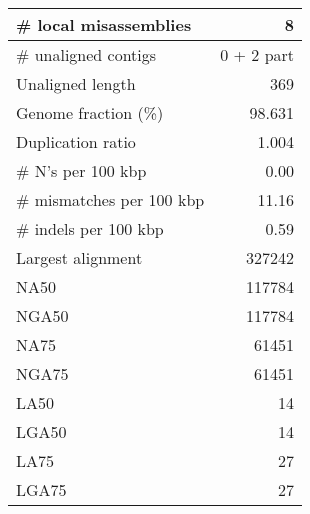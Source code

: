 \documentclass[12pt,a4paper]{article}
\begin{document}
\begin{table}[ht]
\begin{center}
\begin{tabular}{|l*{1}{|r}|}
\# local misassemblies & 8 \\ \hline
\# unaligned contigs & 0 + 2 part \\ \hline
Unaligned length & 369 \\ \hline
Genome fraction (\%) & 98.631 \\ \hline
Duplication ratio & 1.004 \\ \hline
\# N's per 100 kbp & 0.00 \\ \hline
\# mismatches per 100 kbp & 11.16 \\ \hline
\# indels per 100 kbp & 0.59 \\ \hline
Largest alignment & 327242 \\ \hline
NA50 & 117784 \\ \hline
NGA50 & 117784 \\ \hline
NA75 & 61451 \\ \hline
NGA75 & 61451 \\ \hline
LA50 & 14 \\ \hline
LGA50 & 14 \\ \hline
LA75 & 27 \\ \hline
LGA75 & 27 \\ \hline
\end{tabular}
\end{center}
\end{table}
\end{document}
